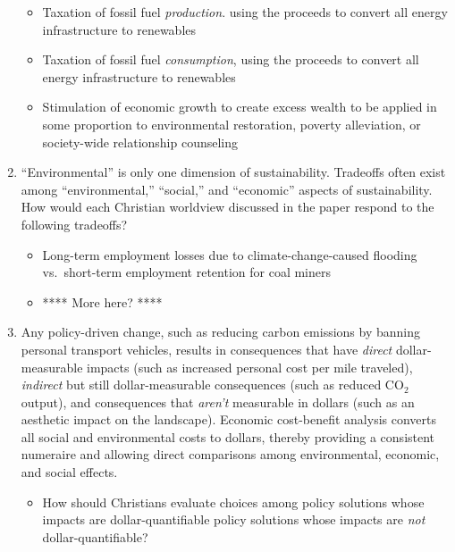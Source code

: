 \documentclass[12pt]{article}
\begin{document}
\begin{enumerate}
\begin{itemize}
		  \item Taxation of fossil fuel \emph{production}. using the proceeds to 
		        convert all energy infrastructure to renewables
		  
		  \item Taxation of fossil fuel \emph{consumption}, using the proceeds to 
		        convert all energy infrastructure to renewables

		  \item Stimulation of economic growth to create excess wealth to be applied 
		        in some proportion to environmental restoration, poverty alleviation,  
				or society-wide relationship counseling

		\end{itemize}
  \item ``Environmental'' is only one dimension of sustainability. 
        Tradeoffs often exist among ``environmental,'' ``social,'' and ``economic'' 
		aspects of sustainability. 
		How would each Christian worldview discussed in the paper respond to the following tradeoffs?
		\begin{itemize}

		  \item Long-term employment losses due to climate-change-caused flooding vs.\ 
		        short-term employment retention for coal miners

		  \item **** More here? **** 

		\end{itemize}
  \item Any policy-driven change, 
        such as reducing carbon emissions by banning personal transport vehicles, 
		results in consequences that have 
		\emph{direct} dollar-measurable impacts 
		(such as increased personal cost per mile traveled),
		\emph{indirect} but still dollar-measurable consequences 
		(such as reduced CO$_2$ output), and 
		consequences that \emph{aren't} measurable in dollars 
		(such as an aesthetic impact on the landscape). 
		Economic cost-benefit analysis converts all social and environmental costs 
		to dollars, thereby providing a consistent numeraire and allowing direct comparisons
		among environmental, economic, and social effects. 
		\begin{itemize}

		  \item How should Christians evaluate choices among 
		        policy solutions whose impacts are dollar-quantifiable
		        policy solutions whose impacts are \emph{not} dollar-quantifiable?


\end{itemize}
\end{enumerate}
\end{document}
